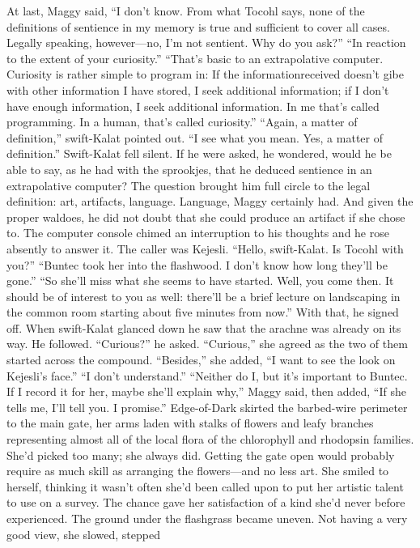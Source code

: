 \documentclass[9pt]{article}
\begin{document}
At last, Maggy said, “I don’t know. From what Tocohl says, none of the definitions of sentience in
my memory is true and sufficient to cover all cases. Legally speaking, however—no, I’m not sentient.
Why do you ask?”
“In reaction to the extent of your curiosity.”
“That’s basic to an extrapolative computer. Curiosity is rather simple to program in: If the informationreceived doesn’t gibe with other information I have stored, I seek additional information; if I don’t have
enough information, I seek additional information. In me that’s called programming. In a human, that’s
called curiosity.”
“Again, a matter of definition,” swift-Kalat pointed out.
“I see what you mean. Yes, a matter of definition.”
Swift-Kalat fell silent. If he were asked, he wondered, would he be able to say, as he had with the
sprookjes, that he deduced sentience in an extrapolative computer? The question brought him full circle
to the legal definition: art, artifacts, language. Language, Maggy certainly had. And given the proper
waldoes, he did not doubt that she could produce an artifact if she chose to.
The computer console chimed an interruption to his thoughts and he rose absently to answer it.
The caller was Kejesli. “Hello, swift-Kalat. Is Tocohl with you?”
“Buntec took her into the flashwood. I don’t know how long they’ll be gone.”
“So she’ll miss what she seems to have started. Well, you come then. It should be of interest to you
as well: there’ll be a brief lecture on landscaping in the common room starting about five minutes from
now.” With that, he signed off.
When swift-Kalat glanced down he saw that the arachne was already on its way. He followed.
“Curious?” he asked.
“Curious,” she agreed as the two of them started across the compound. “Besides,” she added, “I
want to see the look on Kejesli’s face.”
“I don’t understand.”
“Neither do I, but it’s important to Buntec. If I record it for her, maybe she’ll explain why,” Maggy
said, then added, “If she tells me, I’ll tell you. I promise.”
Edge-of-Dark skirted the barbed-wire perimeter to the main gate, her arms laden with stalks of
flowers and leafy branches representing almost all of the local flora of the chlorophyll and rhodopsin
families. She’d picked too many; she always did. Getting the gate open would probably require as much
skill as arranging the flowers—and no less art.
She smiled to herself, thinking it wasn’t often she’d been called upon to put her artistic talent to use
on a survey. The chance gave her satisfaction of a kind she’d never before experienced.
The ground under the flashgrass became uneven. Not having a very good view, she slowed, stepped
\end{document}
